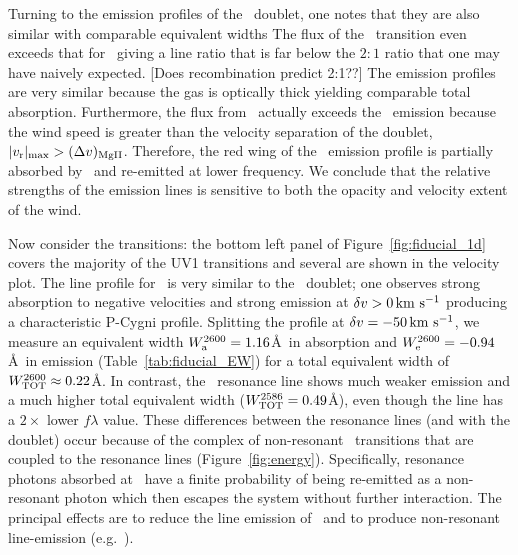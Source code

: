 \documentclass[12pt,preprint]{aastex}
\begin{document}
Turning to the emission profiles of the \mgiid\ doublet, one notes
that they are also similar with comparable equivalent widths The
flux of the \mgiib\ transition even exceeds that for \mgiia\ giving a
line ratio that is far below the $2:1$ ratio that one may have naively
expected. 
[Does recombination predict 2:1??]
The emission profiles are very similar because the gas is optically
thick yielding comparable total absorption. 
Furthermore, the flux from \mgiib\ actually exceeds the
\mgiia\ emission because the wind speed is greater than the velocity separation
of the doublet, $|v_{\rm r}|_{\rm max} > (\Delta v)_{\rm MgII}$.
Therefore, the red wing of the
\mgiia\ emission profile is partially absorbed by \mgiib\ and
re-emitted at lower frequency.  We conclude that the relative
strengths of the emission lines is sensitive to both the opacity and
velocity extent of the wind.   

Now consider the  transitions:
the bottom left panel of Figure~\ref{fig:fiducial_1d} covers the
majority of the  UV1 transitions and several are
shown in the velocity plot.  The line
profile for \feiib\ is very similar to the \mgiid\ doublet;
one observes strong absorption to negative velocities and strong
emission at $\delta v > 0 \, {\rm km~s^{-1}}$ producing a characteristic P-Cygni profile. 
Splitting
the profile at $\delta v = -50 \, {\rm km~s^{-1}}$, we measure an equivalent width
$W^{2600}_{\rm a} = 1.16$\AA\ in absorption and $W^{2600}_{\rm e} =
-0.94$\AA\ in emission (Table~\ref{tab:fiducial_EW}) for a total
equivalent width of $W^{2600}_{\rm TOT} \approx 0.22$\AA.  
In contrast, the \feiia\ resonance line shows much weaker emission and
a much higher total equivalent width ($W^{2586}_{\rm TOT} = 0.49$\AA),
even though the line has a $2 \times$ lower $f\lambda$ value.
These differences between the  resonance lines (and with the
 doublet) occur because of the complex of non-resonant
\feiis\ transitions that are coupled to the resonance lines
(Figure~\ref{fig:energy}).  Specifically, 
resonance photons absorbed at \feiid\ have a finite probability of
being re-emitted as a non-resonant photon which then escapes the system
without further interaction.  The principal effects are to reduce the
line emission of \feiid\ and to produce non-resonant line-emission (e.g.\
\feiic).
\end{document}
